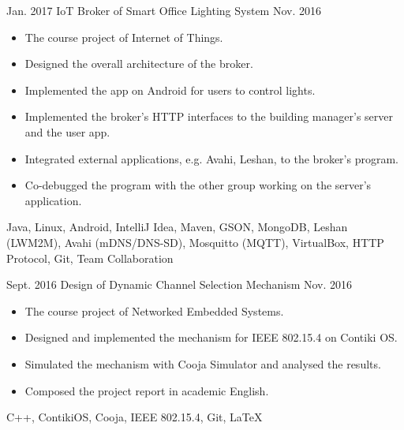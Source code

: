 %
%
%
%
%


\begin{projects}
  
  
  \project
    {Jan. 2017}   {IoT Broker of Smart Office Lighting System}
    {Nov. 2016} {
                      \begin{itemize}
                        \item The course project of Internet of Things.
                        \item Designed the overall architecture of the broker.
                        \item Implemented the app on Android for users to control lights.  
                        \item Implemented the broker’s HTTP interfaces to the building manager's server and the user app.
                        \item Integrated external applications, e.g. Avahi, Leshan, to the broker's program.
                        \item Co-debugged the program with the other group working on the server's application.           
                      \end{itemize}
                    }
                    {Java, Linux, Android, IntelliJ Idea, Maven, GSON, MongoDB, Leshan (LWM2M), Avahi (mDNS/DNS-SD), Mosquitto (MQTT), VirtualBox, HTTP Protocol, Git, Team Collaboration}
  \emptySeparator
  
  
  \project
    {Sept. 2016} {Design of Dynamic Channel Selection Mechanism}
    {Nov. 2016}    {
                      \begin{itemize}
                        \item The course project of Networked Embedded Systems.
                        \item Designed and implemented the mechanism for IEEE 802.15.4 on Contiki OS. 
                        \item Simulated the mechanism with Cooja Simulator and analysed the results.
                        \item Composed the project report in academic English.
                      \end{itemize}
                    }
                    {C++, ContikiOS, Cooja, IEEE 802.15.4, Git, \LaTeX}
  \emptySeparator
  

\end{projects}
